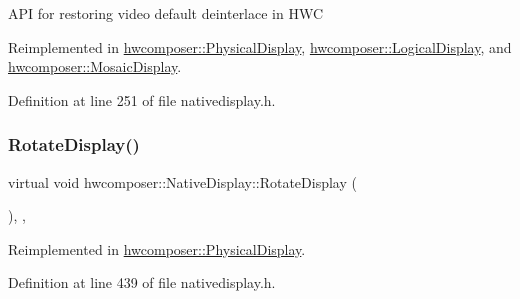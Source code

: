 A\+PI for restoring video default deinterlace in H\+WC 

Reimplemented in \mbox{\hyperlink{classhwcomposer_1_1PhysicalDisplay_a9b8a4d32a3279f79f27878857c22d863}{hwcomposer\+::\+Physical\+Display}}, \mbox{\hyperlink{classhwcomposer_1_1LogicalDisplay_ad0d206b9c0e41732b2f9635fd6ffeb6c}{hwcomposer\+::\+Logical\+Display}}, and \mbox{\hyperlink{classhwcomposer_1_1MosaicDisplay_a907f7b2e5c59a27e5335f8cfadba87f5}{hwcomposer\+::\+Mosaic\+Display}}.



Definition at line 251 of file nativedisplay.\+h.


\begin{DoxyCode}{0}
\end{DoxyCode}
\mbox{\label{classhwcomposer_1_1NativeDisplay_aae775a72140fa5ec526d30218b466348}} 
\subsubsection{\texorpdfstring{Rotate\+Display()}{RotateDisplay()}}
{\footnotesize\ttfamily virtual void hwcomposer\+::\+Native\+Display\+::\+Rotate\+Display (\begin{DoxyParamCaption}\item[{H\+W\+C\+Rotation}]{ }\end{DoxyParamCaption})\hspace{0.3cm}{\ttfamily [inline]}, {\ttfamily [protected]}, {\ttfamily [virtual]}}



Reimplemented in \mbox{\hyperlink{classhwcomposer_1_1PhysicalDisplay_ae9650158e46bd03af1d06aa0e64f3ae6}{hwcomposer\+::\+Physical\+Display}}.



Definition at line 439 of file nativedisplay.\+h.


\begin{DoxyCode}{0}
\end{DoxyCode}
\mbox{\label{classhwcomposer_1_1NativeDisplay_a63c51853e0d82baf9d6445cf831a5ad1}} 
